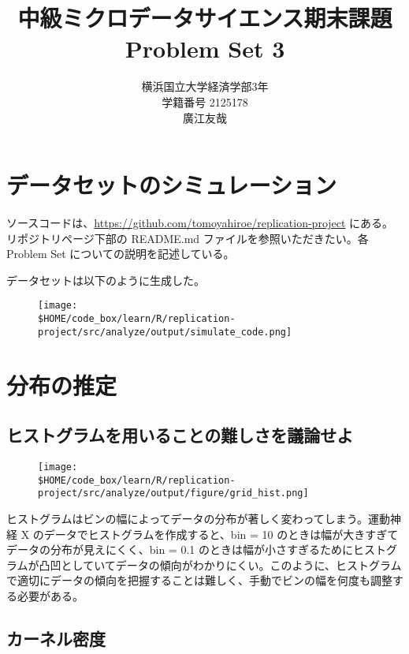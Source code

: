 \documentclass[a4paper]{jsarticle}
\title{中級ミクロデータサイエンス期末課題\\Problem Set 3}
\author{横浜国立大学経済学部3年\\学籍番号 2125178\\廣江友哉}
\begin{document}
\maketitle

\section{データセットのシミュレーション}

ソースコードは、\url{https://github.com/tomoyahiroe/replication-project} にある。リポジトリページ下部の README.md ファイルを参照いただきたい。各Problem Set についての説明を記述している。

データセットは以下のように生成した。

\begin{figure}[H]
  \centering
  \texttt{[image: \\\$HOME/code\_box/learn/R/replication-project/src/analyze/output/simulate\_code.png]}

\end{figure}


\section{分布の推定}

\subsection{ヒストグラムを用いることの難しさを議論せよ}
\begin{figure}[H]
  \centering
  \texttt{[image: \\\$HOME/code\_box/learn/R/replication-project/src/analyze/output/figure/grid\_hist.png]}

\end{figure}

ヒストグラムはビンの幅によってデータの分布が著しく変わってしまう。運動神経 X のデータでヒストグラムを作成すると、bin = 10 のときは幅が大きすぎてデータの分布が見えにくく、bin = 0.1 のときは幅が小さすぎるためにヒストグラムが凸凹としていてデータの傾向がわかりにくい。このように、ヒストグラムで適切にデータの傾向を把握することは難しく、手動でビンの幅を何度も調整する必要がある。

\subsection {カーネル密度}
\end{document}
